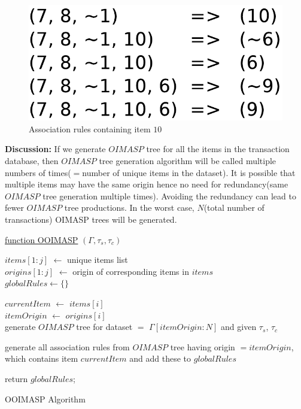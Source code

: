 \documentclass[review]{elsarticle}
\begin{document}
\begin{figure}
\begin{center}
\includegraphics[scale=0.35]{pdf/arules10}
\end{center}
\caption{Association rules containing item $ 10 $}
\label{Fig 10}
\end{figure}

\textbf{Discussion:} If we generate $ OIMASP $ tree for all the items in the transaction database, then $ OIMASP $ tree generation algorithm will be called multiple numbers of times($ = $number of unique items in the dataset). It is possible that multiple items may have the same origin hence no need for redundancy(same $ OIMASP $ tree generation multiple times). Avoiding the redundancy can lead to fewer $ OIMASP $ tree productions. In the worst case, $ N $(total number of transactions) OIMASP trees will be generated.

\begin{algorithm}

    \underline{function OOIMASP} $ (\Gamma, \tau _{s}, \tau _{c}) $\;
       
    $ items[1:j] $ $ \leftarrow $ unique items list \\
    $ origins[1:j] $ $ \leftarrow $ origin of corresponding items in $ items $ \\       
    $ globalRules \leftarrow \lbrace \rbrace $
       
	  {
		$ currentItem $ $ \leftarrow $ $ items[i] $ \\
		$ itemOrigin $ $ \leftarrow $ $ origins[i] $ \\
			  	
      	  {
            generate $ OIMASP $ tree for dataset $ = $ $ \Gamma[itemOrigin:N] $ and given $ \tau _{s} $, $ 				\tau _{c} $
          }	
          
		generate all association rules from $ OIMASP $ tree having origin $ = itemOrigin $, which contains 			item $ currentItem $ and add these to $ globalRules $
	  }
	          		
	return $ globalRules $;      
    \caption{OOIMASP Algorithm}
\end{algorithm}
\end{document}
